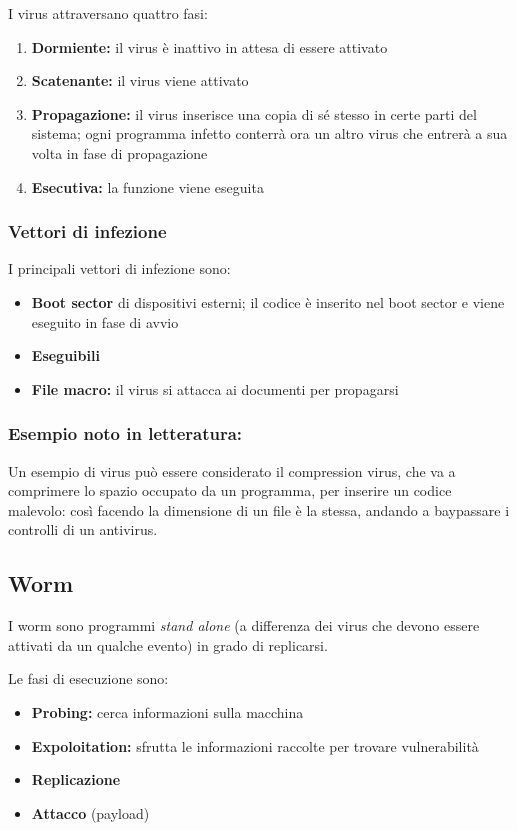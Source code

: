\documentclass{report}
\begin{document}
\noindent I virus attraversano quattro fasi:
\begin{enumerate}
    \item \textbf{Dormiente:} il virus è inattivo in attesa di essere attivato 
    \item \textbf{Scatenante:} il virus viene attivato 
    \item \textbf{Propagazione:} il virus inserisce una copia di sé stesso in certe parti del sistema; ogni programma 
    infetto conterrà ora un altro virus che entrerà a sua volta in fase di propagazione 
    \item \textbf{Esecutiva:} la funzione viene eseguita
\end{enumerate}

\subsubsection{Vettori di infezione}
I principali vettori di infezione sono:
\begin{itemize}
    \item \textbf{Boot sector} di dispositivi esterni; il codice è inserito nel boot sector e viene 
    eseguito in fase di avvio 
    \item \textbf{Eseguibili}
    \item \textbf{File macro:} il virus si attacca ai documenti per propagarsi 
\end{itemize}

\subsubsection{Esempio noto in letteratura:}
Un esempio di virus può essere considerato il compression virus, che va a comprimere lo spazio occupato da un programma, per inserire un codice malevolo:
così facendo la dimensione di un file è la stessa, andando a baypassare i controlli di un antivirus.

\subsection{Worm}
I worm sono programmi \textit{stand alone} (a differenza dei virus che devono essere attivati 
da un qualche evento) in grado di replicarsi.

\noindent Le fasi di esecuzione sono:
\begin{itemize}
    \item \textbf{Probing:} cerca informazioni sulla macchina 
    \item \textbf{Expoloitation:} sfrutta le informazioni raccolte per trovare vulnerabilità
    \item \textbf{Replicazione}
    \item \textbf{Attacco} (payload)
\end{itemize}
\end{document}
